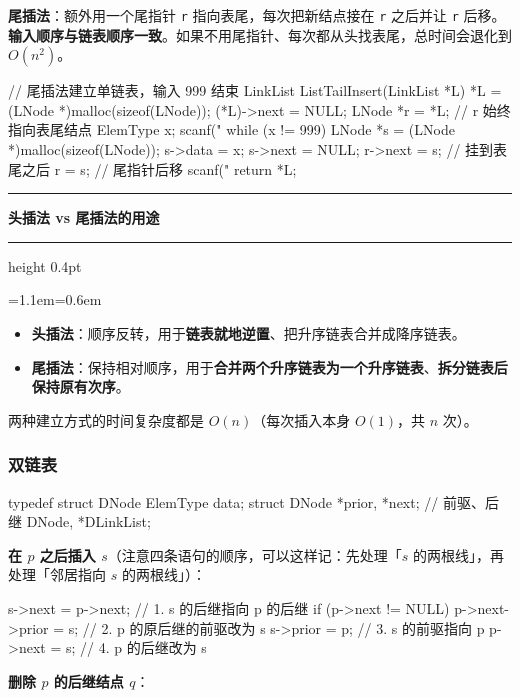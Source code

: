 \documentclass[11pt,openany,UTF8]{ctexbook}
\newcommand{\callouthead}[2]{%
  \par\addvspace{7pt}\noindent
  {\color{#1}\rule[-0.15em]{3pt}{1.05em}}\hspace{0.5em}%
  {\bfseries\color{#1}#2}\par\nobreak\vspace{-0.35em}%
  {\color{rulesep}\hrule height 0.4pt}\nobreak\vspace{0.45em}%
  \begingroup\small\setlength{\parindent}{0pt}%
  \leftskip=1.1em\rightskip=0.6em\noindent\ignorespaces}
\newcommand{\calloutend}{\par\endgroup\addvspace{7pt}}
\newenvironment{callkey}[1]{\callouthead{keybar}{#1}}{\calloutend}
\begin{document}
\textbf{尾插法}：额外用一个尾指针 \texttt{r} 指向表尾，每次把新结点接在 \texttt{r} 之后并让 \texttt{r} 后移。\textbf{输入顺序与链表顺序一致}。如果不用尾指针、每次都从头找表尾，总时间会退化到 $O(n^2)$。

\begin{codebox}
// 尾插法建立单链表，输入 999 结束
LinkList ListTailInsert(LinkList *L) {
    *L = (LNode *)malloc(sizeof(LNode));
    (*L)->next = NULL;
    LNode *r = *L;              // r 始终指向表尾结点
    ElemType x;
    scanf("%
    while (x != 999) {
        LNode *s = (LNode *)malloc(sizeof(LNode));
        s->data = x;
        s->next = NULL;
        r->next = s;            // 挂到表尾之后
        r = s;                  // 尾指针后移
        scanf("%
    }
    return *L;
}
\end{codebox}

\begin{callkey}{头插法 vs 尾插法的用途}
\begin{itemize}
\item \textbf{头插法}：顺序反转，用于\textbf{链表就地逆置}、把升序链表合并成降序链表。
\item \textbf{尾插法}：保持相对顺序，用于\textbf{合并两个升序链表为一个升序链表}、\textbf{拆分链表后保持原有次序}。
\end{itemize}
两种建立方式的时间复杂度都是 $O(n)$（每次插入本身 $O(1)$，共 $n$ 次）。

\end{callkey}

\subsubsection{双链表}

\begin{codebox}
typedef struct DNode {
    ElemType data;
    struct DNode *prior, *next;   // 前驱、后继
} DNode, *DLinkList;
\end{codebox}

\textbf{在 $p$ 之后插入 $s$}（注意四条语句的顺序，可以这样记：先处理「$s$ 的两根线」，再处理「邻居指向 $s$ 的两根线」）：

\begin{codebox}
s->next = p->next;          // 1. s 的后继指向 p 的后继
if (p->next != NULL)
    p->next->prior = s;     // 2. p 的原后继的前驱改为 s
s->prior = p;               // 3. s 的前驱指向 p
p->next = s;                // 4. p 的后继改为 s
\end{codebox}

\textbf{删除 $p$ 的后继结点 $q$}：
\end{document}
